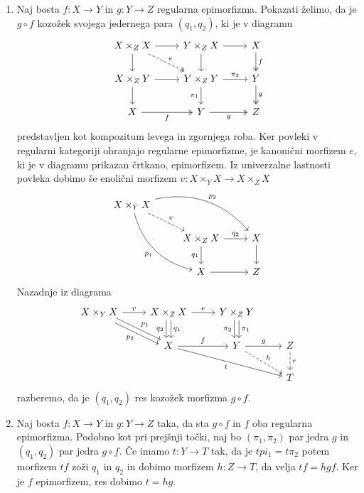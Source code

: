 \documentclass[../kategoricna_logika.tex]{subfiles}
\begin{document}
\begin{dokaz}
\begin{enumerate}[label=(\roman*)]
  \item %
    Naj bosta $f : X \to Y$ in $g : Y \to Z$ regularna epimorfizma.
    Pokazati želimo, da je $g \circ f$ kozožek svojega jedernega para $(q_1, q_2)$,
    ki je v diagramu
    \begin{equation*}
    \begin{tikzcd}[column sep=normal]
      X \times_Z X \ar[d] \ar[r] \ar[dr, dashed, two heads, "e"]  & Y \times_Z X \ar[d ] \ar[r] & X \ar[d, two heads, "f"] \\
      X \times_Z Y \ar[d] \ar[r] & Y \times_Z Y \ar[d, "\pi_1"'] \ar[r, "\pi_2"] & Y \ar[d, two heads, "g"] \\
      X \ar[r, two heads, "f"'] & Y \ar[r, two heads, "g"'] & Z
    \end{tikzcd}
    \end{equation*}
    predstavljen kot kompozitum levega in zgornjega roba.
    Ker povleki v regularni kategoriji ohranjajo regularne epimorfizme,
    je kanonični morfizem $e$, ki je v diagramu prikazan črtkano, epimorfizem.
    Iz univerzalne lastnosti povleka dobimo še enolični morfizem $v : X \times_Y X \to X \times_Z X$
    \begin{equation*}
    \begin{tikzcd}[column sep=normal, row sep=normal]
      X \times_Y X \ar[ddr, bend right, "p_1"'] \ar[drr, bend left, "p_2"] \ar[dr, dashed, "v"] & & \\
      & X \times_Z X \ar[d, "q_1"'] \ar[r, "q_2"] & X \ar[d] \\
      & X \ar[r] & Z
    \end{tikzcd}
    \end{equation*}
    Nazadnje iz diagrama
    \begin{equation*}
    \begin{tikzcd}
      X \times_Y X \ar[dr, shift left, "p_1"] \ar[dr, shift right, "p_2"'] \ar[r, "v"] & X \times_Z X \ar[d, shift left, "q_1"] \ar[d, shift right, "q_2"'] \ar[r, "e"] & Y \times_Z Y \ar[d, shift left, "\pi_1"] \ar[d, shift right, "\pi_2"'] &  \\
      & X \ar[r, "f"] \ar[drr, "t"'] & Y \ar[r, "g"] \ar[dr, dashed, "h"] & Z \ar[d, dashed, "r"] \\
      & & & T
    \end{tikzcd}
    \end{equation*}
    razberemo, da je $(q_1, q_2)$ res kozožek morfizma $g \circ f$.

    \item  %
      Naj bosta $f : X \to Y$ in $g : Y \to Z$ taka, da sta $g \circ f$ in $f$ oba regularna epimorfizma.
      Podobno kot pri prejšnji točki, naj bo $(\pi_1, \pi_2)$ par jedra $g$ in $(q_1, q_2)$ par jedra $g \circ f$.
      Če imamo $t : Y \to T$ tak, da je $t pi_1 = t \pi_2$ potem morfizem $tf$ zoži $q_1$ in $q_2$ in dobimo morfizem
      $h : Z \to T$, da velja $t f = h g f$. Ker je $f$ epimorfizem, res dobimo $t = h g$.
\end{enumerate}
\end{dokaz}
\end{document}
